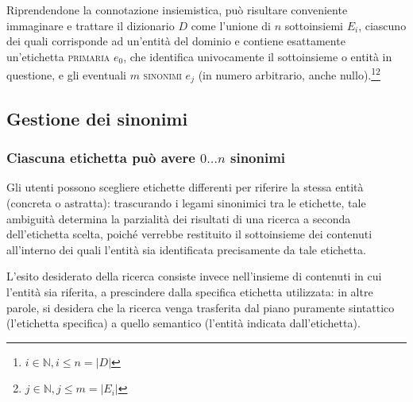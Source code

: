 \documentclass[10pt,a4paper,headinclude,footinclude,hidelinks]{scrreprt} %
\begin{document}
Riprendendone la connotazione insiemistica, può risultare conveniente immaginare e trattare il dizionario $D$ come l'unione di $n$ sottoinsiemi $E_i$, ciascuno dei quali corrisponde ad un'entità del dominio e contiene esattamente un'etichetta \textsc{primaria} $e_0$, che identifica univocamente il sottoinsieme o entità in questione, e gli eventuali $m$ \textsc{sinonimi} $e_j$ (in numero arbitrario, anche nullo).\footnote{$i \in \mathbb{N}, i \leq n=\left|D\right|$}\footnote{$j \in \mathbb{N}, j \leq m=\left|E_i\right|$}


	\subsection{Gestione dei sinonimi}
	\subsubsection{Ciascuna etichetta può avere $0\ldots n$ sinonimi}
	Gli utenti possono scegliere etichette differenti per riferire la stessa entità (concreta o astratta): trascurando i legami sinonimici tra le etichette, tale ambiguità determina la parzialità dei risultati di una ricerca a seconda dell'etichetta scelta, poiché verrebbe restituito il sottoinsieme dei contenuti all'interno dei quali l'entità sia identificata precisamente da tale etichetta.
	

	L'esito desiderato della ricerca consiste invece nell'insieme di contenuti in cui l'entità sia riferita, a prescindere dalla specifica etichetta utilizzata: in altre parole, si desidera che la ricerca venga trasferita dal piano puramente sintattico (l'etichetta specifica) a quello semantico (l'entità indicata dall'etichetta).
\end{document}
